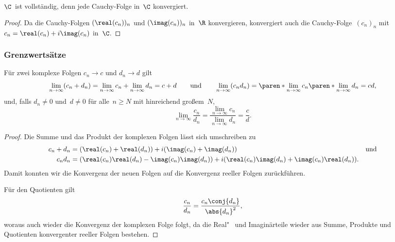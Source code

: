 \documentclass[a4paper]{article}
\begin{document}
\begin{corollary}
    $\C$~ist vollständig, denn jede Cauchy-Folge in~$\C$ konvergiert.
\end{corollary}

\begin{proof}
    Da die Cauchy-Folgen $(\real(c_n))_n$ und $(\imag(c_n))_n$ in~$\R$ konvergieren, konvergiert auch die Cauchy-Folge~$(c_n)_n$ mit $c_n = \real(c_n)+i\imag(c_n)$ in~$\C$.
\end{proof}

\subsubsection{Grenzwertsätze}

\begin{corollary}[Grenzwertsätze in~$\C$]
    Für zwei komplexe Folgen $c_n \to c$ und $d_n \to d$ gilt
    \begin{equation*}
        \lim_{n\to\infty} (c_n+d_n) = \lim_{n\to\infty} c_n + \lim_{n\to\infty} d_n = c+d \qquad\text{und}\qquad \lim_{n\to\infty} (c_nd_n) = \paren*{\lim_{n\to\infty} c_n} \paren*{\lim_{n\to\infty} d_n} = cd,
    \end{equation*}
    und, falls $d_n \neq 0$ und~$d \neq 0$ für alle~$n \geq N$ mit hinreichend großem~$N$,
    \begin{equation*}
        \lim_{n\to\infty} \frac{c_n}{d_n} = \frac{\lim_{n\to\infty} c_n}{\lim_{n\to\infty} d_n} = \frac{c}{d}.
    \end{equation*}
\end{corollary}

\begin{proof}
    Die Summe und das Produkt der komplexen Folgen lässt sich umschreiben zu
    \begin{align*}
        c_n+d_n & = (\real(c_n)+\real(d_n)) + i(\imag(c_n)+\imag(d_n))                                          &  & \text{und} \\
        c_nd_n  & = (\real(c_n)\real(d_n)-\imag(c_n)\imag(d_n)) + i(\real(c_n)\imag(d_n)+\imag(c_n)\real(d_n)).
    \end{align*}
    Damit konnten wir die Konvergenz der neuen Folgen auf die Konvergenz reeller Folgen zurückführen.

    Für den Quotienten gilt
    \begin{equation*}
        \frac{c_n}{d_n} = \frac{c_n\conj{d_n}}{\abs{d_n}^2},
    \end{equation*}
    woraus auch wieder die Konvergenz der komplexen Folge folgt, da die Real"~ und Imaginärteile wieder aus Summe, Produkte und Quotienten konvergenter reeller Folgen bestehen.
\end{proof}
\end{document}
